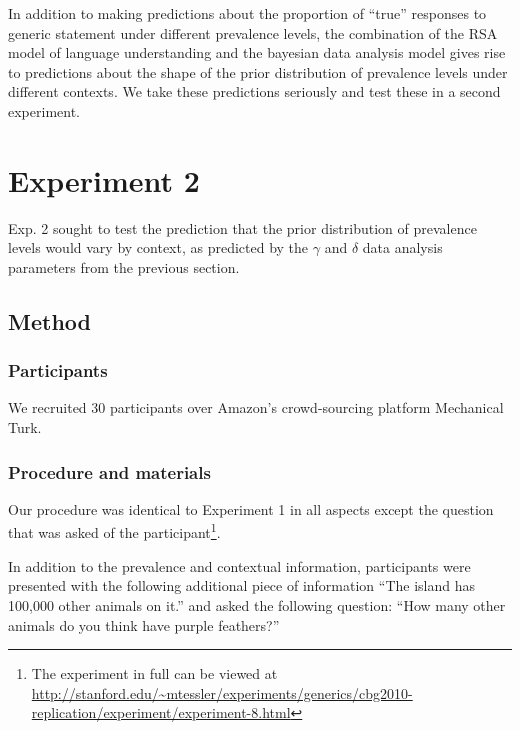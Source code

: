 \documentclass[10pt,letterpaper]{article}
\begin{document}

In addition to making predictions about the proportion of ``true'' responses to generic statement under different prevalence levels, the combination of the RSA model of language understanding and the bayesian data analysis model gives rise to predictions about the shape of the prior distribution of prevalence levels under different contexts. We take these predictions seriously and test these in a second experiment. 

\section{Experiment 2}

Exp. 2 sought to test the prediction that the prior distribution of prevalence levels would vary by context, as predicted by the $\gamma$ and $\delta$ data analysis parameters from the previous section.

\subsection{Method}

\subsubsection{Participants}

We recruited 30 participants over Amazon's crowd-sourcing platform Mechanical Turk. 

\subsubsection{Procedure and materials}

Our procedure was identical to Experiment 1 in all aspects except the question that was asked of the participant\footnote{The experiment in full can be viewed at \url{http://stanford.edu/~mtessler/experiments/generics/cbg2010-replication/experiment/experiment-8.html}}. 

In addition to the prevalence and contextual information, participants were presented with the following additional piece of information ``The island has 100,000 other animals on it.'' and asked the following question: ``How many other animals do you think have purple feathers?''
\end{document}

